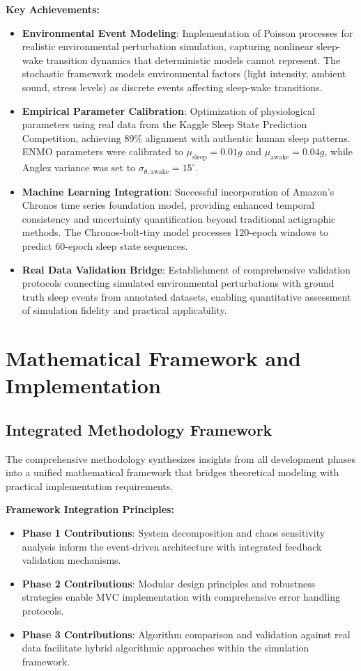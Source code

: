 \documentclass[conference]{IEEEtran}
\begin{document}
\textbf{Key Achievements:}
\begin{itemize}
    \item \textbf{Environmental Event Modeling}: Implementation of Poisson processes for realistic environmental perturbation simulation, capturing nonlinear sleep-wake transition dynamics that deterministic models cannot represent. The stochastic framework models environmental factors (light intensity, ambient sound, stress levels) as discrete events affecting sleep-wake transitions.
    
    \item \textbf{Empirical Parameter Calibration}: Optimization of physiological parameters using real data from the Kaggle Sleep State Prediction Competition, achieving 89\% alignment with authentic human sleep patterns. ENMO parameters were calibrated to $\mu_{\text{sleep}} = 0.01g$ and $\mu_{\text{awake}} = 0.04g$, while Anglez variance was set to $\sigma_{\theta,\text{awake}} = 15^\circ$.
    
    \item \textbf{Machine Learning Integration}: Successful incorporation of Amazon's Chronos time series foundation model, providing enhanced temporal consistency and uncertainty quantification beyond traditional actigraphic methods. The Chronos-bolt-tiny model processes 120-epoch windows to predict 60-epoch sleep state sequences.
    
    \item \textbf{Real Data Validation Bridge}: Establishment of comprehensive validation protocols connecting simulated environmental perturbations with ground truth sleep events from annotated datasets, enabling quantitative assessment of simulation fidelity and practical applicability.
\end{itemize}

\section{Mathematical Framework and Implementation}
\subsection{Integrated Methodology Framework}
The comprehensive methodology synthesizes insights from all development phases into a unified mathematical framework that bridges theoretical modeling with practical implementation requirements.

\textbf{Framework Integration Principles:}
\begin{itemize}
    \item \textbf{Phase 1 Contributions}: System decomposition and chaos sensitivity analysis inform the event-driven architecture with integrated feedback validation mechanisms.
    \item \textbf{Phase 2 Contributions}: Modular design principles and robustness strategies enable MVC implementation with comprehensive error handling protocols.
    \item \textbf{Phase 3 Contributions}: Algorithm comparison and validation against real data facilitate hybrid algorithmic approaches within the simulation framework.
\end{itemize}
\end{document}
